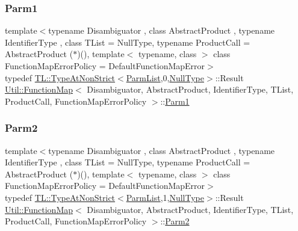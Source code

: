 \subsubsection{\texorpdfstring{Parm1}{Parm1}\hspace{0.1cm}{\footnotesize\ttfamily [3/3]}}
{\footnotesize\ttfamily template$<$typename Disambiguator , class Abstract\+Product , typename Identifier\+Type , class T\+List  = Null\+Type, typename Product\+Call  = Abstract\+Product ($\ast$)(), template$<$ typename, class $>$ class Function\+Map\+Error\+Policy = Default\+Function\+Map\+Error$>$ \\
typedef \mbox{\hyperlink{structUtil_1_1TL_1_1TypeAtNonStrict}{T\+L\+::\+Type\+At\+Non\+Strict}}$<$\mbox{\hyperlink{classUtil_1_1FunctionMap_a6cf0e6766cf6f20642ba61c4994bb477}{Parm\+List}},0,\mbox{\hyperlink{classUtil_1_1NullType}{Null\+Type}}$>$\+::Result \mbox{\hyperlink{classUtil_1_1FunctionMap}{Util\+::\+Function\+Map}}$<$ Disambiguator, Abstract\+Product, Identifier\+Type, T\+List, Product\+Call, Function\+Map\+Error\+Policy $>$\+::\mbox{\hyperlink{classUtil_1_1FunctionMap_a7b842c0101fae8075e8b21c90ede63cb}{Parm1}}}

\mbox{\label{classUtil_1_1FunctionMap_a46a76423783c6a8dcc4442ffb8cf54a4}} 
\subsubsection{\texorpdfstring{Parm2}{Parm2}\hspace{0.1cm}{\footnotesize\ttfamily [1/3]}}
{\footnotesize\ttfamily template$<$typename Disambiguator , class Abstract\+Product , typename Identifier\+Type , class T\+List  = Null\+Type, typename Product\+Call  = Abstract\+Product ($\ast$)(), template$<$ typename, class $>$ class Function\+Map\+Error\+Policy = Default\+Function\+Map\+Error$>$ \\
typedef \mbox{\hyperlink{structUtil_1_1TL_1_1TypeAtNonStrict}{T\+L\+::\+Type\+At\+Non\+Strict}}$<$\mbox{\hyperlink{classUtil_1_1FunctionMap_a6cf0e6766cf6f20642ba61c4994bb477}{Parm\+List}},1,\mbox{\hyperlink{classUtil_1_1NullType}{Null\+Type}}$>$\+::Result \mbox{\hyperlink{classUtil_1_1FunctionMap}{Util\+::\+Function\+Map}}$<$ Disambiguator, Abstract\+Product, Identifier\+Type, T\+List, Product\+Call, Function\+Map\+Error\+Policy $>$\+::\mbox{\hyperlink{classUtil_1_1FunctionMap_a46a76423783c6a8dcc4442ffb8cf54a4}{Parm2}}}

